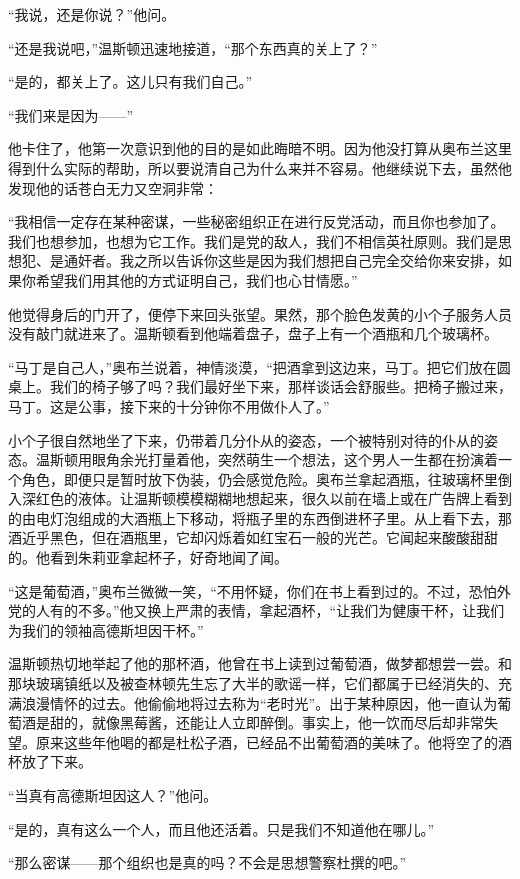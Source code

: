 ``我说，还是你说？''他问。

``还是我说吧，''温斯顿迅速地接道，``那个东西真的关上了？''

``是的，都关上了。这儿只有我们自己。''

``我们来是因为------''

他卡住了，他第一次意识到他的目的是如此晦暗不明。因为他没打算从奥布兰这里得到什么实际的帮助，所以要说清自己为什么来并不容易。他继续说下去，虽然他发现他的话苍白无力又空洞非常：

``我相信一定存在某种密谋，一些秘密组织正在进行反党活动，而且你也参加了。我们也想参加，也想为它工作。我们是党的敌人，我们不相信英社原则。我们是思想犯、是通奸者。我之所以告诉你这些是因为我们想把自己完全交给你来安排，如果你希望我们用其他的方式证明自己，我们也心甘情愿。''

他觉得身后的门开了，便停下来回头张望。果然，那个脸色发黄的小个子服务人员没有敲门就进来了。温斯顿看到他端着盘子，盘子上有一个酒瓶和几个玻璃杯。

``马丁是自己人，''奥布兰说着，神情淡漠，``把酒拿到这边来，马丁。把它们放在圆桌上。我们的椅子够了吗？我们最好坐下来，那样谈话会舒服些。把椅子搬过来，马丁。这是公事，接下来的十分钟你不用做仆人了。''

小个子很自然地坐了下来，仍带着几分仆从的姿态，一个被特别对待的仆从的姿态。温斯顿用眼角余光打量着他，突然萌生一个想法，这个男人一生都在扮演着一个角色，即便只是暂时放下伪装，仍会感觉危险。奥布兰拿起酒瓶，往玻璃杯里倒入深红色的液体。让温斯顿模模糊糊地想起来，很久以前在墙上或在广告牌上看到的由电灯泡组成的大酒瓶上下移动，将瓶子里的东西倒进杯子里。从上看下去，那酒近乎黑色，但在酒瓶里，它却闪烁着如红宝石一般的光芒。它闻起来酸酸甜甜的。他看到朱莉亚拿起杯子，好奇地闻了闻。

``这是葡萄酒，''奥布兰微微一笑，``不用怀疑，你们在书上看到过的。不过，恐怕外党的人有的不多。''他又换上严肃的表情，拿起酒杯，``让我们为健康干杯，让我们为我们的领袖高德斯坦因干杯。''

温斯顿热切地举起了他的那杯酒，他曾在书上读到过葡萄酒，做梦都想尝一尝。和那块玻璃镇纸以及被查林顿先生忘了大半的歌谣一样，它们都属于已经消失的、充满浪漫情怀的过去。他偷偷地将过去称为``老时光''。出于某种原因，他一直认为葡萄酒是甜的，就像黑莓酱，还能让人立即醉倒。事实上，他一饮而尽后却非常失望。原来这些年他喝的都是杜松子酒，已经品不出葡萄酒的美味了。他将空了的酒杯放了下来。

``当真有高德斯坦因这人？''他问。

``是的，真有这么一个人，而且他还活着。只是我们不知道他在哪儿。''

``那么密谋------那个组织也是真的吗？不会是思想警察杜撰的吧。''

